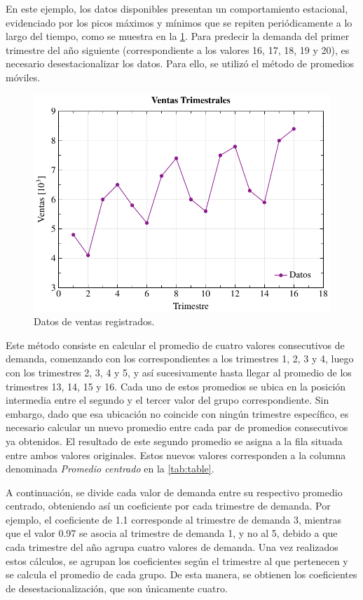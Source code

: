 En este ejemplo, los datos disponibles presentan un comportamiento estacional,
evidenciado por los picos máximos y mínimos que se repiten periódicamente a lo
largo del tiempo, como se muestra en la \cref{fig:season-data}.
Para predecir la demanda del primer trimestre del año siguiente
(correspondiente a los valores 16, 17, 18, 19 y 20), es necesario
desestacionalizar los datos.
Para ello, se utilizó el método de promedios móviles.

\begin{figure}[htpb!]
  \centering
  \includegraphics[width=\columnwidth]{../Figures/season-data.pdf}
  \caption{Datos de ventas registrados.}
  \label{fig:season-data}
\end{figure}

Este método consiste en calcular el promedio de cuatro valores consecutivos de
demanda, comenzando con los correspondientes a los trimestres 1, 2, 3 y 4,
luego con los trimestres 2, 3, 4 y 5, y así sucesivamente hasta llegar al
promedio de los trimestres 13, 14, 15 y 16.
Cada uno de estos promedios se ubica en la posición intermedia entre el segundo
y el tercer valor del grupo correspondiente.
Sin embargo, dado que esa ubicación no coincide con ningún trimestre específico,
es necesario calcular un nuevo promedio entre cada par de promedios consecutivos
ya obtenidos.
El resultado de este segundo promedio se asigna a la fila situada entre ambos
valores originales.
Estos nuevos valores corresponden a la columna denominada \textit{Promedio centrado}
en la \cref{tab:table}.

A continuación, se divide cada valor de demanda entre su respectivo promedio
centrado, obteniendo así un coeficiente por cada trimestre de demanda.
Por ejemplo, el coeficiente de 1.1 corresponde al trimestre de demanda 3, mientras
que el valor 0.97 se asocia al trimestre de demanda 1, y no al 5, debido a que
cada trimestre del año agrupa cuatro valores de demanda.
Una vez realizados estos cálculos, se agrupan los coeficientes según el
trimestre al que pertenecen y se calcula el promedio de cada grupo.
De esta manera, se obtienen los coeficientes de desestacionalización, que son
únicamente cuatro.

